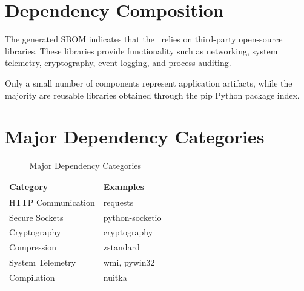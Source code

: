 \vspace{0.4cm}


\section{Dependency Composition}

The generated SBOM indicates that the \ProjectName\ relies on third-party open-source libraries. These libraries provide functionality such as networking, system telemetry, cryptography, event logging, and process auditing.

Only a small number of components represent application artifacts, while the majority are reusable libraries obtained through the pip Python package index.

\vspace{0.4cm}


\section{Major Dependency Categories}

\begin{table}[H]
\centering
\small
\renewcommand{\arraystretch}{1.3}

\begin{tabular}{p{5cm}p{8cm}}
\toprule
\rowcolor{ZWPrimary}
\textbf{\color{white}Category} & \textbf{\color{white}Examples} \\
\midrule
HTTP Communication & requests \\
Secure Sockets & python-socketio \\
Cryptography & cryptography \\
Compression & zstandard \\
System Telemetry & wmi, pywin32 \\
Compilation & nuitka \\
\bottomrule
\end{tabular}
\caption{Major Dependency Categories}
\end{table}

\vspace{0.4cm}

